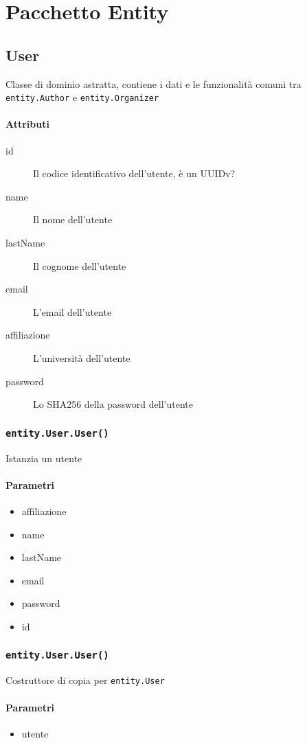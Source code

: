 \section{Pacchetto Entity}
\label{sec:impl_entity}
\subsection{User}
Classe di dominio astratta, contiene i dati e le funzionalità comuni
tra \texttt{entity.Author} e \texttt{entity.Organizer}
\paragraph{Attributi}
\begin{description}
\item[id] Il codice identificativo dell'utente, è un UUIDv?
\item[name] Il nome dell'utente
\item[lastName] Il cognome dell'utente
\item[email] L'email dell'utente
\item[affiliazione] L'università dell'utente
\item[password] Lo SHA256 della password dell'utente
\end{description}
\subsubsection{\texttt{entity.User.User()}}
Istanzia un utente
\paragraph{Parametri}
\begin{itemize}
\item affiliazione
\item name
\item lastName
\item email
\item password
\item id
\end{itemize}

\subsubsection{\texttt{entity.User.User()}}
Costruttore di copia per \texttt{entity.User}
\paragraph{Parametri}
\begin{itemize}
\item utente
\end{itemize}

